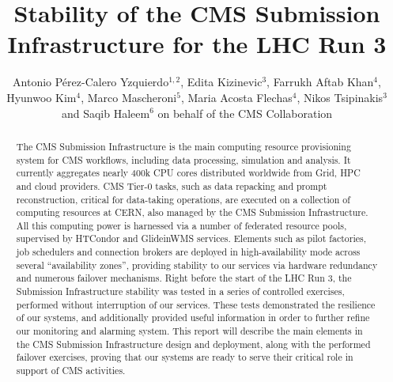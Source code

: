 \documentclass[a4paper]{jpconf}
\begin{document}
\title{Stability of the CMS Submission Infrastructure for the LHC Run 3}

\author{Antonio Pérez-Calero Yzquierdo$^{1,2}$, Edita Kizinevic$^3$, Farrukh Aftab Khan$^4$, Hyunwoo Kim$^4$, Marco Mascheroni$^5$, Maria Acosta Flechas$^4$, Nikos Tsipinakis$^3$ and Saqib Haleem$^6$ on behalf of the CMS Collaboration}
\address{$^1$ Port d'Informaci\'o Cientifica (PIC), Barcelona, Spain}
\address{$^2$ Centro de Investigaciones Energ\'eticas, Medioambientales y Tecnol\'ogicas (CIEMAT), Madrid, Spain}
\address{$^3$ European Organization for Nuclear Research (CERN), Geneva, Switzerland}
\address{$^4$ Fermi National Accelerator Laboratory, Batavia, IL, USA}
\address{$^5$ University of California San Diego, La Jolla, CA, USA}
\address{$^6$ National Centre for Physics, Islamabad, Pakistan}

\begin{abstract}
The CMS Submission Infrastructure is the main computing resource provisioning system for CMS workflows, including data processing, simulation and analysis. It currently aggregates nearly 400k CPU cores distributed worldwide from Grid, HPC and cloud providers. CMS Tier-0 tasks, such as data repacking and prompt reconstruction, critical for data-taking operations, are executed on a collection of computing resources at CERN, also managed by the CMS Submission Infrastructure. All this computing power is harnessed via a number of federated resource pools, supervised by HTCondor and GlideinWMS services. Elements such as pilot factories, job schedulers and connection brokers are deployed in high-availability mode across several “availability zones”, providing stability to our services via hardware redundancy and numerous failover mechanisms. Right before the start of the LHC Run 3, the Submission Infrastructure stability was tested in a series of controlled exercises, performed without interruption of our services. These tests demonstrated the resilience of our systems, and additionally provided useful information in order to further refine our monitoring and alarming system. This report will describe the main elements in the CMS Submission Infrastructure design and deployment, along with the performed failover exercises, proving that our systems are ready to serve their critical role in support of CMS activities.
\end{abstract}
\end{document}
